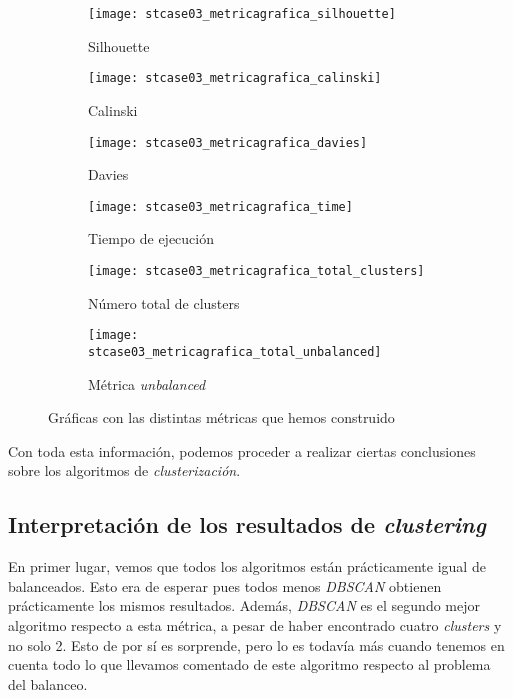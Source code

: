 \documentclass[11pt]{article}
\begin{document}
\begin{figure}[H]
    \centering

    \begin{subfigure}[b]{0.45 \textwidth}
        \texttt{[image: stcase03\_metricagrafica\_silhouette]}
        \caption{Silhouette}
    \end{subfigure}
    \begin{subfigure}[b]{0.45 \textwidth}
        \texttt{[image: stcase03\_metricagrafica\_calinski]}
        \caption{Calinski}
    \end{subfigure}

    \begin{subfigure}[b]{0.45 \textwidth}
        \texttt{[image: stcase03\_metricagrafica\_davies]}
        \caption{Davies}
    \end{subfigure}
    \begin{subfigure}[b]{0.45 \textwidth}
        \texttt{[image: stcase03\_metricagrafica\_time]}
        \caption{Tiempo de ejecución}
    \end{subfigure}

    \begin{subfigure}[b]{0.45 \textwidth}
        \texttt{[image: stcase03\_metricagrafica\_total\_clusters]}
        \caption{Número total de clusters}
    \end{subfigure}
    \begin{subfigure}[b]{0.45 \textwidth}
        \texttt{[image: stcase03\_metricagrafica\_total\_unbalanced]}
        \caption{Métrica \emph{unbalanced}}
    \end{subfigure}

    \caption{Gráficas con las distintas métricas que hemos construido}
    \label{stcase03_metricas_graficas:figure}
\end{figure}

Con toda esta información, podemos proceder a realizar ciertas conclusiones sobre los algoritmos de \emph{clusterización}.

\pagebreak

\subsection{Interpretación de los resultados de \emph{clustering}}

En primer lugar, vemos que todos los algoritmos están prácticamente igual de balanceados. Esto era de esperar pues todos menos \emph{DBSCAN} obtienen prácticamente los mismos resultados. Además, \emph{DBSCAN} es el segundo mejor algoritmo respecto a esta métrica, a pesar de haber encontrado cuatro \emph{clusters} y no solo 2. Esto de por sí es sorprende, pero lo es todavía más cuando tenemos en cuenta todo lo que llevamos comentado de este algoritmo respecto al problema del balanceo.
\end{document}
